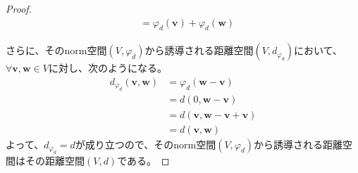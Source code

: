 \documentclass[dvipdfmx]{jsarticle}
\begin{document}
\begin{proof}
\begin{align*}
&= \varphi_{d}\left( \mathbf{v} \right) + \varphi_{d}\left( \mathbf{w} \right)
\end{align*}\par
さらに、そのnorm空間$\left( V,\varphi_{d} \right)$から誘導される距離空間$\left( V,d_{\varphi_{d}} \right)$において、$\forall\mathbf{v},\mathbf{w} \in V$に対し、次のようになる。
\begin{align*}
d_{\varphi_{d}}\left( \mathbf{v},\mathbf{w} \right) &= \varphi_{d}\left( \mathbf{w} - \mathbf{v} \right)\\
&= d\left( 0,\mathbf{w} - \mathbf{v} \right)\\
&= d\left( \mathbf{v},\mathbf{w} - \mathbf{v} + \mathbf{v} \right)\\
&= d\left( \mathbf{v},\mathbf{w} \right)
\end{align*}
よって、$d_{\varphi_{d}} = d$が成り立つので、そのnorm空間$\left( V,\varphi_{d} \right)$から誘導される距離空間はその距離空間$(V,d)$である。
\end{proof}
\end{document}
